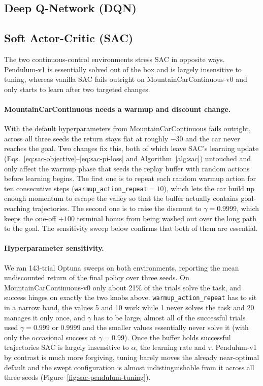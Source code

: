 \documentclass{article}
\begin{document}
\subsection{Deep Q-Network (DQN)}

\subsection{Soft Actor-Critic (SAC)}

The two continuous-control environments stress SAC in opposite ways. Pendulum-v1 is essentially solved out of the box and is largely insensitive to tuning, whereas vanilla SAC fails outright on MountainCarContinuous-v0 and only starts to learn after two targeted changes.

\paragraph{MountainCarContinuous needs a warmup and discount change.}
With the default hyperparameters from \citet{haarnoja2018soft} MountainCarContinuous fails outright, across all three seeds the return stays flat at roughly $-30$ and the car never reaches the goal. Two changes fix this, both of which leave SAC's learning update (Eqs.~\ref{eq:sac-objective}--\ref{eq:sac-pi-loss} and Algorithm~\ref{alg:sac}) untouched and only affect the warmup phase that seeds the replay buffer with random actions before learning begins. The first one is to repeat each random warmup action for ten consecutive steps (\texttt{warmup\_action\_repeat}$=10$), which lets the car build up enough momentum to escape the valley so that the buffer actually contains goal-reaching trajectories. The second one is to raise the discount to $\gamma = 0.9999$, which keeps the one-off $+100$ terminal bonus from being washed out over the long path to the goal. The sensitivity sweep below confirms that both of them are essential.

\paragraph{Hyperparameter sensitivity.}
We ran 143-trial Optuna sweeps on both environments, reporting the mean undiscounted return of the final policy over three seeds. On MountainCarContinuous-v0 only about 21\% of the trials solve the task, and success hinges on exactly the two knobs above. \texttt{warmup\_action\_repeat} has to sit in a narrow band, the values 5 and 10 work while 1 never solves the task and 20 manages it only once, and $\gamma$ has to be large, almost all of the successful trials used $\gamma=0.999$ or $0.9999$ and the smaller values essentially never solve it (with only the occasional success at $\gamma=0.99$). Once the buffer holds successful trajectories SAC is largely insensitive to $\alpha$, the learning rate and $\tau$. Pendulum-v1 by contrast is much more forgiving, tuning barely moves the already near-optimal default and the swept configuration is almost indistinguishable from it across all three seeds (Figure~\ref{fig:sac-pendulum-tuning}).
\end{document}
